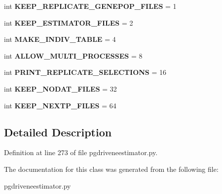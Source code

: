 \begin{DoxyCompactItemize}
\item 
int {\bfseries K\+E\+E\+P\+\_\+\+R\+E\+P\+L\+I\+C\+A\+T\+E\+\_\+\+G\+E\+N\+E\+P\+O\+P\+\_\+\+F\+I\+L\+ES} = 1\hypertarget{classnegui_1_1pgdriveneestimator_1_1DebugMode_a28d1c7693a4bec8f391bef360d51b463}{}\label{classnegui_1_1pgdriveneestimator_1_1DebugMode_a28d1c7693a4bec8f391bef360d51b463}

\item 
int {\bfseries K\+E\+E\+P\+\_\+\+E\+S\+T\+I\+M\+A\+T\+O\+R\+\_\+\+F\+I\+L\+ES} = 2\hypertarget{classnegui_1_1pgdriveneestimator_1_1DebugMode_a2f02d51f5d3a4a6c9cfaa8d0f6ea1879}{}\label{classnegui_1_1pgdriveneestimator_1_1DebugMode_a2f02d51f5d3a4a6c9cfaa8d0f6ea1879}

\item 
int {\bfseries M\+A\+K\+E\+\_\+\+I\+N\+D\+I\+V\+\_\+\+T\+A\+B\+LE} = 4\hypertarget{classnegui_1_1pgdriveneestimator_1_1DebugMode_a1f5d7e71208d6a4a9d7a63b0207e1ab8}{}\label{classnegui_1_1pgdriveneestimator_1_1DebugMode_a1f5d7e71208d6a4a9d7a63b0207e1ab8}

\item 
int {\bfseries A\+L\+L\+O\+W\+\_\+\+M\+U\+L\+T\+I\+\_\+\+P\+R\+O\+C\+E\+S\+S\+ES} = 8\hypertarget{classnegui_1_1pgdriveneestimator_1_1DebugMode_af0b037fef1711a912d1f83ed61f57097}{}\label{classnegui_1_1pgdriveneestimator_1_1DebugMode_af0b037fef1711a912d1f83ed61f57097}

\item 
int {\bfseries P\+R\+I\+N\+T\+\_\+\+R\+E\+P\+L\+I\+C\+A\+T\+E\+\_\+\+S\+E\+L\+E\+C\+T\+I\+O\+NS} = 16\hypertarget{classnegui_1_1pgdriveneestimator_1_1DebugMode_a238432e744ac313e2ce4d7de801ffe92}{}\label{classnegui_1_1pgdriveneestimator_1_1DebugMode_a238432e744ac313e2ce4d7de801ffe92}

\item 
int {\bfseries K\+E\+E\+P\+\_\+\+N\+O\+D\+A\+T\+\_\+\+F\+I\+L\+ES} = 32\hypertarget{classnegui_1_1pgdriveneestimator_1_1DebugMode_ac55e866ab4d12b084f2480d625c9dbb8}{}\label{classnegui_1_1pgdriveneestimator_1_1DebugMode_ac55e866ab4d12b084f2480d625c9dbb8}

\item 
int {\bfseries K\+E\+E\+P\+\_\+\+N\+E\+X\+T\+P\+\_\+\+F\+I\+L\+ES} = 64\hypertarget{classnegui_1_1pgdriveneestimator_1_1DebugMode_a13096a90911741639b1eea0e1595cb2b}{}\label{classnegui_1_1pgdriveneestimator_1_1DebugMode_a13096a90911741639b1eea0e1595cb2b}

\end{DoxyCompactItemize}


\subsection{Detailed Description}


Definition at line 273 of file pgdriveneestimator.\+py.



The documentation for this class was generated from the following file\+:\begin{DoxyCompactItemize}
\item 
pgdriveneestimator.\+py\end{DoxyCompactItemize}
